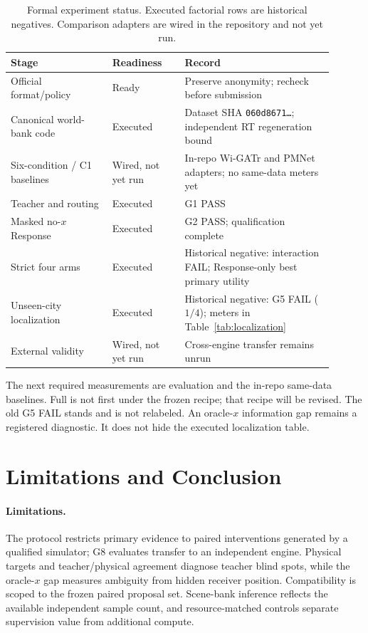 \documentclass{article}
\begin{document}
\begin{table}[t]
\caption{Formal experiment status. Executed factorial rows are historical
negatives. Comparison adapters are wired in the repository and not yet run.}
\label{tab:status}
\centering
\small
\begin{tabular}{p{0.29\linewidth}p{0.20\linewidth}p{0.41\linewidth}}
\toprule
Stage & Readiness & Record \\
\midrule
Official format/policy & Ready & Preserve anonymity; recheck before submission \\
Canonical world-bank code & Executed & Dataset SHA \texttt{060d8671\ldots}; independent RT regeneration bound \\
Six-condition / C1 baselines & Wired, not yet run & In-repo Wi-GATr and PMNet adapters; no same-data meters yet \\
Teacher and routing & Executed & G1 PASS \\
Masked no-$x$ Response & Executed & G2 PASS; qualification complete \\
Strict four arms & Executed & Historical negative: interaction FAIL; Response-only best primary utility \\
Unseen-city localization & Executed & Historical negative: G5 FAIL ($1/4$); meters in Table~\ref{tab:localization} \\
External validity & Wired, not yet run & Cross-engine transfer remains unrun \\
\bottomrule
\end{tabular}
\end{table}

The next required measurements are evaluation and the in-repo same-data
baselines.  Full is not first under the frozen recipe; that recipe will be
revised.  The old G5 FAIL stands and is not relabeled.  An oracle-$x$
information gap remains a registered diagnostic.  It does not hide the
executed localization table.

\section{Limitations and Conclusion}

\paragraph{Limitations.}
The protocol restricts primary evidence to paired interventions generated by a
qualified simulator; G8 evaluates transfer to an independent engine.  Physical
targets and teacher/physical agreement diagnose teacher blind spots, while the oracle-$x$
gap measures ambiguity from hidden receiver position.  Compatibility is scoped
to the frozen paired proposal set.  Scene-bank inference reflects the available
independent sample count, and resource-matched controls separate supervision
value from additional compute.
\end{document}
